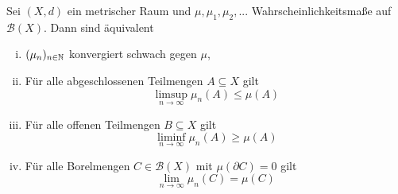 
\begin{theorem}
    Sei $(X,d)$ ein metrischer Raum und $\mu, \mu_1, \mu_2,...$ Wahrscheinlichkeitsmaße auf $\mathcal{B}(X)$. Dann sind äquivalent
    \begin{enumerate}[(i)]
        \item $(\mu_n)_{n \in \mathbb{N}}$ konvergiert schwach gegen $\mu$,
        \item Für alle abgeschlossenen Teilmengen $A \subseteq X$ gilt 
        $$
            \limsup_{n \to \infty} \mu_n(A) \leq \mu(A)
        $$
        \item Für alle offenen Teilmengen $B \subseteq X$ gilt 
        $$
            \liminf_{n \to \infty} \mu_n(A) \geq \mu(A)
        $$
        \item Für alle Borelmengen $C \in \mathcal{B}(X)$ mit $\mu(\partial C) = 0$ gilt 
        $$
            \lim_{n \to \infty}\mu_n(C) = \mu(C)
        $$
    \end{enumerate}
\end{theorem}

